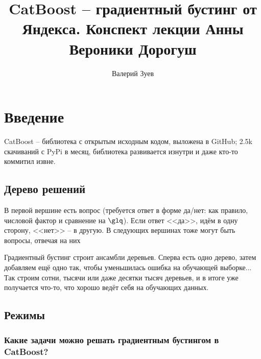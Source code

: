\documentclass[a4paper,12pt]{article}
\begin{document}
\title{CatBoost -- градиентный бустинг от Яндекса. Конспект лекции Анны Вероники Дорогуш}

\author{Валерий Зуев}

\maketitle

\section{Введение}

CatBoost -- библиотека с открытым исходным кодом, выложена в GitHub; 2.5k скачиваний с PyPi в месяц, библиотека развивается изнутри и даже кто-то коммитил извне.

\subsection{Дерево решений}
В первой вершине есть вопрос (требуется ответ в форме да/нет: как правило, числовой фактор и сравнение на $\glq$). Если ответ <<да>>, идём в одну сторону, <<нет>> -- в другую.
В следующих вершинах тоже могут быть вопросы, отвечая на них

Градиентный бустинг строит ансамбли деревьев.
Сперва есть одно дерево, затем добавляем ещё одно так, чтобы уменьшилась ошибка на обучающей выборке...
Так строим сотни, тысячи или даже десятки тысяч деревьев, и в итоге уже получается что-то, что хорошо ведёт себя на обучающих данных.

\subsection{Режимы}

\subsubsection{Какие задачи можно решать градиентным бустингом в CatBoost?}
\end{document}
